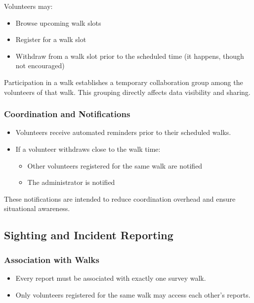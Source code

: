 \documentclass[11pt]{article}
\begin{document}
Volunteers may:
\begin{itemize}
    \item Browse upcoming walk slots
    \item Register for a walk slot
    \item Withdraw from a walk slot prior to the scheduled time (it happens, though not encouraged)
\end{itemize}

Participation in a walk establishes a temporary collaboration group among the volunteers of that walk.
This grouping directly affects data visibility and sharing.

\subsubsection{Coordination and Notifications}

\begin{itemize}
    \item Volunteers receive automated reminders prior to their scheduled walks.
    \item If a volunteer withdraws close to the walk time:
    \begin{itemize}
        \item Other volunteers registered for the same walk are notified
        \item The administrator is notified
    \end{itemize}
\end{itemize}

These notifications are intended to reduce coordination overhead and ensure situational awareness.

\subsection{Sighting and Incident Reporting}

\subsubsection{Association with Walks}

\begin{itemize}
    \item Every report must be associated with exactly one survey walk.
    \item Only volunteers registered for the same walk may access each other’s reports.
\end{itemize}
\end{document}
